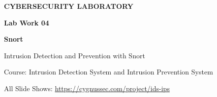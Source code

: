 \begin{frame}[plain]
  \vfill
  {\color{ResearchColor}\fontsize{15}{18}\selectfont\bfseries CYBERSECURITY LABORATORY\par}
  \vspace{0.15cm}
  {\color{SecondaryColor}\fontsize{17}{20}\selectfont\bfseries Lab Work 04\par}
  \vspace{0.22cm}
  {\color{TitleColor}\fontsize{30}{36}\selectfont\bfseries Snort\par}
  \vspace{0.25cm}
  {\color{ResearchColor}\fontsize{17}{21}\selectfont
    Intrusion Detection and Prevention with Snort\par}
  \vspace{0.2cm}
  {\color{SecondaryColor}\fontsize{13}{16}\selectfont
    Course: Intrusion Detection System and Intrusion Prevention System\par}
  \vfill
  {\color{SecondaryColor}\fontsize{12}{15}\selectfont All Slide Shows: \url{https://cygnussec.com/project/ids-ips}\par}
\end{frame}
